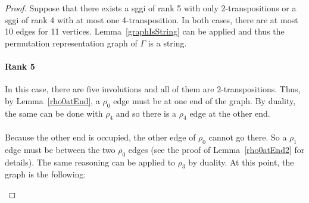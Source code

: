 \begin{proof}
  Suppose that there exists a sggi of rank 5 with only 2-transpositions or a sggi of rank 4 with at most one 4-transposition. In both cases, there are at most 10 edges for 11 vertices. Lemma~\ref{graphIsString} can be applied and thus the permutation representation graph of $\Gamma$ is a string.

  \paragraph{Rank 5}
  In this case, there are five involutions and all of them are 2-transpositions. Thus, by Lemma~\ref{rho0atEnd}, a $\rho_0$ edge must be at one end of the graph. By duality, the same can be done with $\rho_4$ and so there is a $\rho_4$ edge at the other end.

  \paragraph{}
  Because the other end is occupied, the other edge of $\rho_0$ cannot go there. So a $\rho_1$ edge must be between the two $\rho_0$ edges (see the proof of Lemma~\ref{rho0atEnd2} for details). The same reasoning can be applied to $\rho_3$ by duality. At this point, the graph is the following:

  \begin{figure}[H]
    \begin{center}
\end{center}
\end{figure}
\end{proof}
